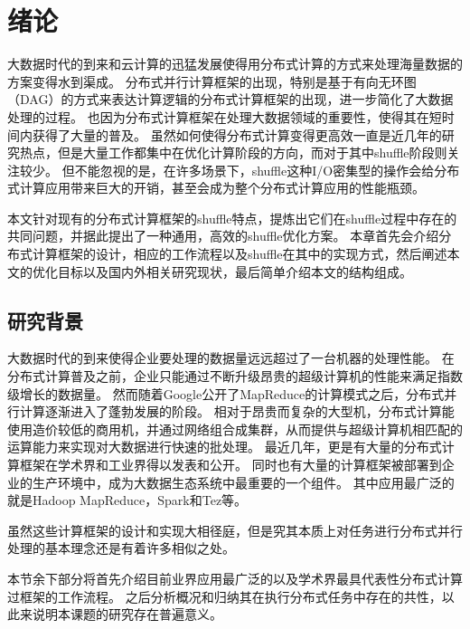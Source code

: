 
\chapter{绪论}
\label{chap:intro}

大数据时代的到来和云计算的迅猛发展使得用分布式计算的方式来处理海量数据的方案变得水到渠成。
分布式并行计算框架的出现，特别是基于有向无环图（DAG）的方式来表达计算逻辑的分布式计算框架的出现，进一步简化了大数据处理的过程。
也因为分布式计算框架在处理大数据领域的重要性，使得其在短时间内获得了大量的普及。
虽然如何使得分布式计算变得更高效一直是近几年的研究热点，但是大量工作都集中在优化计算阶段的方向，而对于其中shuffle阶段则关注较少。
但不能忽视的是，在许多场景下，shuffle这种I/O密集型的操作会给分布式计算应用带来巨大的开销，甚至会成为整个分布式计算应用的性能瓶颈。

本文针对现有的分布式计算框架的shuffle特点，提炼出它们在shuffle过程中存在的共同问题，并据此提出了一种通用，高效的shuffle优化方案。
本章首先会介绍分布式计算框架的设计，相应的工作流程以及shuffle在其中的实现方式，然后阐述本文的优化目标以及国内外相关研究现状，最后简单介绍本文的结构组成。

\section{研究背景}

大数据时代的到来使得企业要处理的数据量远远超过了一台机器的处理性能。
在分布式计算普及之前，企业只能通过不断升级昂贵的超级计算机的性能来满足指数级增长的数据量。
然而随着Google公开了MapReduce\cite{mapreduce}的计算模式之后，分布式并行计算逐渐进入了蓬勃发展的阶段。
相对于昂贵而复杂的大型机，分布式计算能使用造价较低的商用机，并通过网络组合成集群，从而提供与超级计算机相匹配的运算能力来实现对大数据进行快速的批处理。
最近几年，更是有大量的分布式计算框架在学术界和工业界得以发表和公开。
同时也有大量的计算框架被部署到企业的生产环境中，成为大数据生态系统中最重要的一个组件。
其中应用最广泛的就是Hadoop MapReduce\cite{hadoop}，Spark\cite{apachespark}和Tez\cite{tez}等。

虽然这些计算框架的设计和实现大相径庭，但是究其本质上对任务进行分布式并行处理的基本理念还是有着许多相似之处。

本节余下部分将首先介绍目前业界应用最广泛的以及学术界最具代表性分布式计算过框架的工作流程。
之后分析概况和归纳其在执行分布式任务中存在的共性，以此来说明本课题的研究存在普遍意义。

